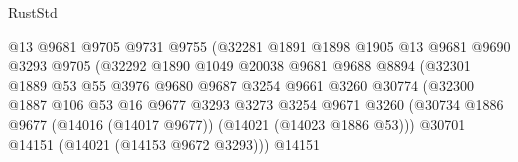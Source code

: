\begin{lexlean}{RustStd}
\begin{coremodule}
                                      @13
                                      @9681
                                      @9705
                                      @9731
                                      @9755
                                      (@32281
                                        @1891
                                        @1898
                                        @1905
                                        @13
                                        @9681
                                        @9690
                                        @3293
                                        @9705
                                        (@32292
                                          @1890
                                          @1049
                                          @20038
                                          @9681
                                          @9688
                                          @8894
                                          (@32301
                                            @1889
                                            @53
                                            @55
                                            @3976
                                            @9680
                                            @9687
                                            @3254
                                            @9661
                                            @3260
                                            @30774
                                            (@32300
                                              @1887
                                              @106
                                              @53
                                              @16
                                              @9677
                                              @3293
                                              @3273
                                              @3254
                                              @9671
                                              @3260
                                              (@30734
                                                @1886
                                                @9677
                                                (@14016 (@14017 @9677))
                                                (@14021 (@14023 @1886 @53)))
                                              @30701
                                              @14151
                                              (@14021 (@14153 @9672 @3293)))
                                            @14151

\end{coremodule}
\end{lexlean}
